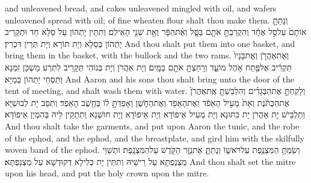 {and unleavened bread, and cakes unleavened mingled with oil, and wafers unleavened spread with oil; of fine wheaten flour shalt thou make them.}{}
{וְנָתַתָּ֤ אוֹתָם֙ עַל\maqqaf סַ֣ל אֶחָ֔ד וְהִקְרַבְתָּ֥ אֹתָ֖ם בַּסָּ֑ל וְאֶ֨ת\maqqaf הַפָּ֔ר וְאֵ֖ת שְׁנֵ֥י הָאֵילִֽם׃}
{וְתִתֵּין יָתְהוֹן עַל סַלָּא חַד וּתְקָרֵיב יָתְהוֹן בְּסַלָּא וְיָת תּוֹרָא וְיָת תְּרֵין דִּכְרִין׃}
{And thou shalt put them into one basket, and bring them in the basket, with the bullock and the two rams.}{}
{וְאֶת\maqqaf אַהֲרֹ֤ן וְאֶת\maqqaf בָּנָיו֙ תַּקְרִ֔יב אֶל\maqqaf פֶּ֖תַח אֹ֣הֶל מוֹעֵ֑ד וְרָחַצְתָּ֥ אֹתָ֖ם בַּמָּֽיִם׃}
{וְיָת אַהֲרֹן וְיָת בְּנוֹהִי תְּקָרֵיב לִתְרַע מַשְׁכַּן זִמְנָא וְתַסְחֵי יָתְהוֹן בְּמַיָּא׃}
{And Aaron and his sons thou shalt bring unto the door of the tent of meeting, and shalt wash them with water.}{}
{וְלָקַחְתָּ֣ אֶת\maqqaf הַבְּגָדִ֗ים וְהִלְבַּשְׁתָּ֤ אֶֽת\maqqaf אַהֲרֹן֙ אֶת\maqqaf הַכֻּתֹּ֔נֶת וְאֵת֙ מְעִ֣יל הָאֵפֹ֔ד וְאֶת\maqqaf הָאֵפֹ֖ד וְאֶת\maqqaf הַחֹ֑שֶׁן וְאָפַדְתָּ֣ ל֔וֹ בְּחֵ֖שֶׁב הָאֵפֹֽד׃}
{וְתִסַּב יָת לְבוּשַׁיָּא וְתַלְבֵּישׁ יָת אַהֲרֹן יָת כִּתּוּנָא וְיָת מְעִיל אֵיפוֹדָא וְיָת אֵיפוֹדָא וְיָת חוּשְׁנָא וְתַתְקֵין לֵיהּ בְּהִמְיַן אֵיפוֹדָא׃}
{And thou shalt take the garments, and put upon Aaron the tunic, and the robe of the ephod, and the ephod, and the breastplate, and gird him with the skilfully woven band of the ephod.}{}
{וְשַׂמְתָּ֥ הַמִּצְנֶ֖פֶת עַל\maqqaf רֹאשׁ֑וֹ וְנָתַתָּ֛ אֶת\maqqaf נֵ֥זֶר הַקֹּ֖דֶשׁ עַל\maqqaf הַמִּצְנָֽפֶת׃}
{וּתְשַׁוֵּי מַצְנַפְתָּא עַל רֵישֵׁיהּ וְתִתֵּין יָת כְּלִילָא דְּקוּדְשָׁא עַל מַצְנַפְתָּא׃}
{And thou shalt set the mitre upon his head, and put the holy crown upon the mitre.}{}
